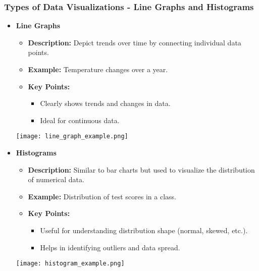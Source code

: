 \documentclass[aspectratio=169]{beamer}
\begin{document}
\begin{frame}[fragile]
    \frametitle{Types of Data Visualizations - Line Graphs and Histograms}
    \begin{itemize}
        \item \textbf{Line Graphs}
        \begin{itemize}
            \item \textbf{Description:} Depict trends over time by connecting individual data points.
            \item \textbf{Example:} Temperature changes over a year.
            \item \textbf{Key Points:}
            \begin{itemize}
                \item Clearly shows trends and changes in data.
                \item Ideal for continuous data.
            \end{itemize}
        \end{itemize}
        \texttt{[image: line\_graph\_example.png]}

        \vspace{1em}
        
        \item \textbf{Histograms}
        \begin{itemize}
            \item \textbf{Description:} Similar to bar charts but used to visualize the distribution of numerical data.
            \item \textbf{Example:} Distribution of test scores in a class.
            \item \textbf{Key Points:}
            \begin{itemize}
                \item Useful for understanding distribution shape (normal, skewed, etc.).
                \item Helps in identifying outliers and data spread.
            \end{itemize}
        \end{itemize}
        \texttt{[image: histogram\_example.png]}
    \end{itemize}
\end{frame}
\end{document}
